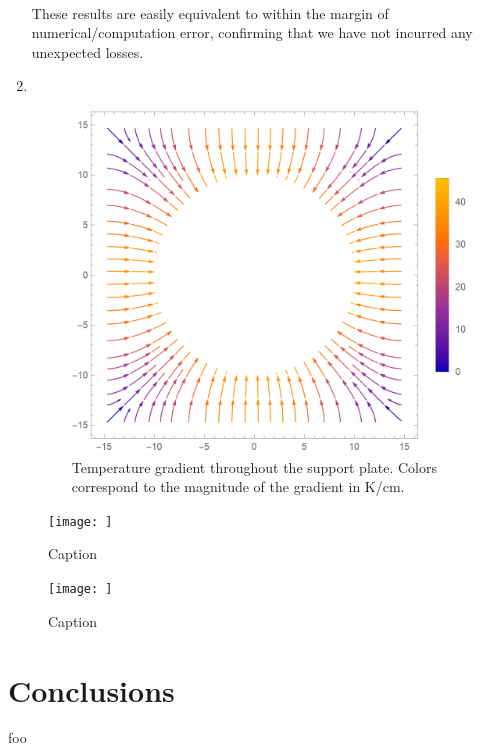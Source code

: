 \documentclass{article}
\begin{document}
\begin{enumerate}[label=\alph*)]
\begin{gather*}
    \end{gather*}
    These results are easily equivalent to within the margin of numerical/computation error, confirming that we have not incurred any unexpected losses.
    \newpage
    \item $ $ \begin{figure}[H]
        \centering
        \includegraphics[width=5in]{homework10/2c.png}
        \caption{Temperature gradient throughout the support plate. Colors correspond to the magnitude of the gradient in K/cm.}
        \label{fig:2c}
    \end{figure}
\end{enumerate}

\bigskip
{}
\medskip

\begin{figure}
    \centering
    \texttt{[image: ]}
    \caption{Caption}
    \label{fig:3}
\end{figure}

\bigskip
{}
\medskip

\begin{figure}
    \centering
    \texttt{[image: ]}
    \caption{Caption}
    \label{fig:4}
\end{figure}

\section{Conclusions}

foo
\end{document}
